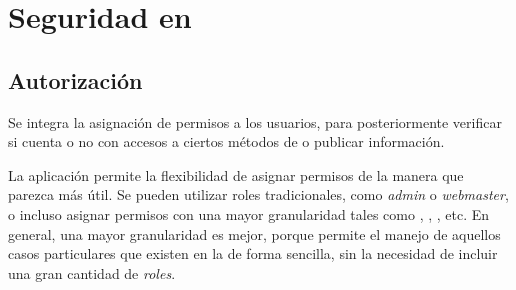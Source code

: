 \section{Seguridad en \eframeworkAF}



\subsection{Autorización}

Se integra la asignación de permisos a los usuarios, para posteriormente verificar si cuenta o no con accesos a ciertos métodos de \meteorNAME o publicar información.

La aplicación permite la flexibilidad de asignar permisos de la manera que parezca más útil. Se pueden utilizar roles tradicionales, como \textit{admin} o \textit{webmaster}, o incluso asignar permisos con una mayor granularidad tales como \verMensajesSecretosCPT, \vistaUsuariosCPT, \lecturaPlanillasCPT, etc. En general, una mayor granularidad es mejor, porque permite el manejo de aquellos casos particulares que existen en la \vidaRealCPT de forma sencilla, sin la necesidad de incluir una gran cantidad de \textit{roles}.




